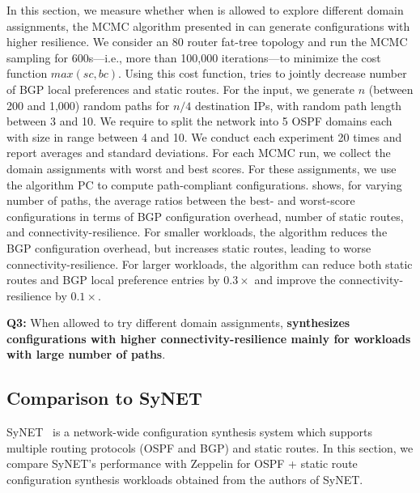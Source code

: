 In this section, we measure whether
when \name  is allowed to explore different domain assignments,
the MCMC algorithm presented in 
can 
generate configurations
with higher resilience.
We consider an 80 router fat-tree topology and run the MCMC sampling
for 600s---i.e., more than 100,000 iterations---to minimize the
 cost function $max(sc, bc)$. Using this cost function, \name
 tries to jointly decrease number of 
 BGP local preferences and static routes. 
 For the input, we generate $n$ (between
200 and 1,000) random paths for $n/4$ destination IPs, with random
path length between 3 and 10.  We require \name to split the network
into 5 OSPF domains each with size in range between 4 and 10.
We conduct each experiment 20 times and report averages and standard
deviations.  For each MCMC run, we collect the domain assignments with
worst and best scores.  For these assignments, we use the algorithm PC
to compute path-compliant configurations.
 shows, for varying number of paths, the average ratios
between the best- and worst-score configurations
in terms of
BGP configuration overhead, 
number of static routes, and 
connectivity-resilience.
For smaller workloads, 
the algorithm reduces the BGP configuration overhead, but increases 
static routes, leading to worse connectivity-resilience. For 
larger workloads, the algorithm can
reduce both static routes 
and BGP local preference entries by $0.3\times$
and improve the connectivity-resilience 
by $0.1\times$.

\textbf{Q3:}
When allowed to try different domain assignments,
\textbf{\name synthesizes configurations with higher connectivity-resilience mainly for workloads with large number of paths}.

\subsection{Comparison to SyNET}
\label{sec:synet}
SyNET~\cite{synet} is a network-wide configuration synthesis system 
which supports multiple routing protocols (OSPF and BGP) and static 
routes. In this section, we compare SyNET's performance with Zeppelin 
for OSPF + static route configuration synthesis workloads obtained from the 
authors of SyNET.

